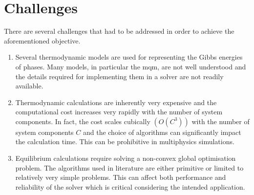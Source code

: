 \section{Challenges}
    There are several challenges that had to be addressed in order to achieve the aforementioned objective.
    \begin{enumerate}
        \item Several thermodynamic models are used for representing the Gibbs energies of phases. Many models, in particular the \gls{mqm}, are not well understood and the details required for implementing them in a solver are not readily available.
        \item Thermodynamic calculations are inherently very expensive and the computational cost increases very rapidly with the number of system components. In fact, the cost  scales cubically $\left(\mathit{O}\left(C^3\right)\right)$ with the number of system components $C$ and the choice of algorithms can significantly impact the calculation time. This can be prohibitive in multiphysics simulations.
        \item Equilibrium calculations require solving a non-convex global optimisation problem. The algorithms used in literature are either primitive or limited to relatively very simple problems. This can affect both performance and reliability of the solver which is critical considering the intended application.
        \end{enumerate}

